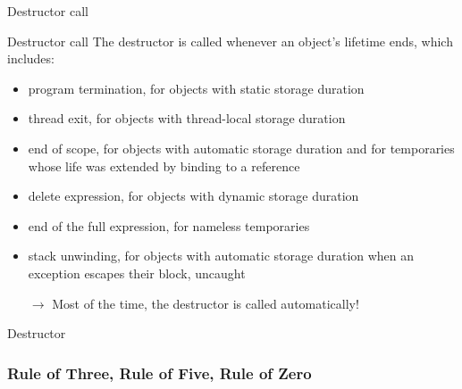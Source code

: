 \begin{frame}{Destructor call}{}
  \begin{block}{Destructor call}
    The destructor is called whenever an object's lifetime ends, which includes:
    \begin{itemize}
    \item
      program termination, for objects with static storage duration
    \item
      thread exit, for objects with thread-local storage duration
    \item
      end of scope, for objects with automatic storage duration and for temporaries whose life was extended by binding to a reference
    \item
      delete expression, for objects with dynamic storage duration
    \item
      end of the full expression, for nameless temporaries
    \item
      stack unwinding, for objects with automatic storage duration when an exception escapes their block, uncaught
    \item[$\to$]
      Most of the time, the destructor is called automatically!
    \end{itemize}
  \end{block}
\end{frame}

\begin{frame}{Destructor}{}
  \begin{example}[Destructor]
  \end{example}
\end{frame}


\subsubsection{Rule of Three, Rule of Five, Rule of Zero}

